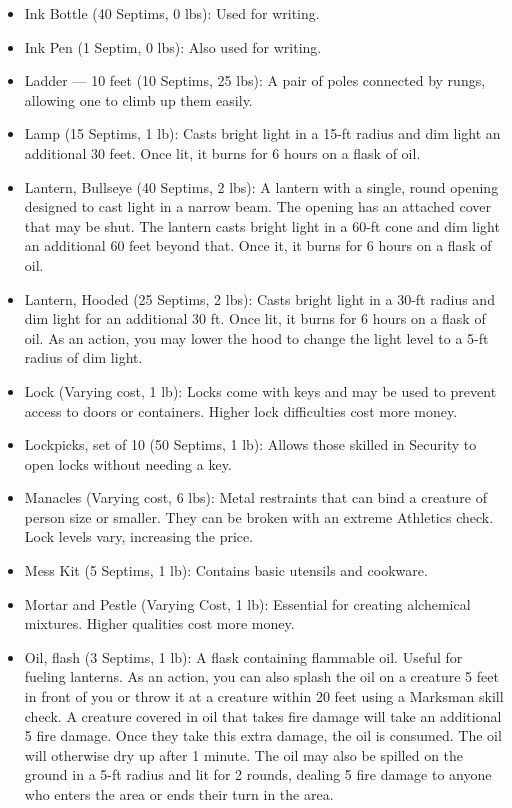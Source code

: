 \documentclass[12pt]{book}
\begin{document}
\begin{itemize}
	\item Ink Bottle (40 Septims, 0 lbs): Used for writing.
	\item Ink Pen (1 Septim, 0 lbs): Also used for writing.
	\item Ladder --- 10 feet (10 Septims, 25 lbs): A pair of poles connected by rungs, allowing one to climb up them easily.
	\item Lamp (15 Septims, 1 lb): Casts bright light in a 15-ft radius and dim light an additional 30 feet. Once lit, it burns for 6 hours on a flask of oil.
	\item Lantern, Bullseye (40 Septims, 2 lbs): A lantern with a single, round opening designed to cast light in a narrow beam. The opening has an attached cover that may be shut. The lantern casts bright light in a 60-ft cone and dim light an additional 60 feet beyond that. Once it, it burns for 6 hours on a flask of oil.
	\item Lantern, Hooded (25 Septims, 2 lbs): Casts bright light in a 30-ft radius and dim light for an additional 30 ft. Once lit, it burns for 6 hours on a flask of oil. As an action, you may lower the hood to change the light level to a 5-ft radius of dim light.
	\item Lock (Varying cost, 1 lb): Locks come with keys and may be used to prevent access to doors or containers. Higher lock difficulties cost more money.
	\item Lockpicks, set of 10 (50 Septims, 1 lb): Allows those skilled in Security to open locks without needing a key.
	\item Manacles (Varying cost, 6 lbs): Metal restraints that can bind a creature of person size or smaller. They can be broken with an extreme Athletics check. Lock levels vary, increasing the price.
	\item Mess Kit (5 Septims, 1 lb): Contains basic utensils and cookware.
	\item Mortar and Pestle (Varying Cost, 1 lb): Essential for creating alchemical mixtures. Higher qualities cost more money.
	\item Oil, flash (3 Septims, 1 lb): A flask containing flammable oil. Useful for fueling lanterns. As an action, you can also splash the oil on a creature 5 feet in front of you or throw it at a creature within 20 feet using a Marksman skill check. A creature covered in oil that takes fire damage will take an additional 5 fire damage. Once they take this extra damage, the oil is consumed. The oil will otherwise dry up after 1 minute. The oil may also be spilled on the ground in a 5-ft radius and lit for 2 rounds, dealing 5 fire damage to anyone who enters the area or ends their turn in the area.

\end{itemize}
\end{document}
